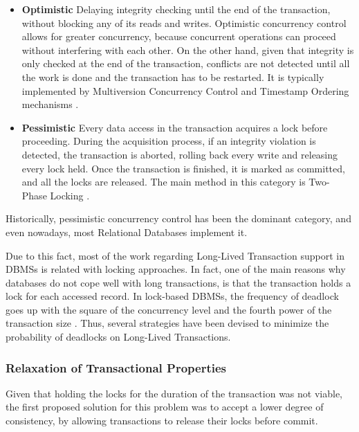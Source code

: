 \documentclass{llncs}
\begin{document}
\begin{itemize}

\item {\bf Optimistic} Delaying integrity checking until the end of
  the transaction, without blocking any of its reads and writes.
  Optimistic concurrency control allows for greater concurrency,
  because concurrent operations can proceed without interfering with
  each other. On the other hand, given that integrity is only checked
  at the end of the transaction, conflicts are not detected until all
  the work is done and the transaction has to be restarted. It is
  typically implemented by Multiversion Concurrency Control and
  Timestamp Ordering mechanisms \cite{Bernstein1981}.

\item {\bf Pessimistic} Every data access in the transaction acquires
  a lock before proceeding. During the acquisition process, if an
  integrity violation is detected, the transaction is aborted, rolling
  back every write and releasing every lock held. Once the transaction
  is finished, it is marked as committed, and all the locks are
  released. The main method in this category is Two-Phase Locking
  \cite{Bernstein1981}.

\end{itemize}

Historically, pessimistic concurrency control has been the dominant
category, and even nowadays, most Relational Databases implement it.

Due to this fact, most of the work regarding Long-Lived Transaction
support in DBMSs is related with locking approaches. In fact, one of
the main reasons why databases do not cope well with long
transactions, is that the transaction holds a lock for each accessed
record. In lock-based DBMSs, the frequency of deadlock goes up with
the square of the concurrency level and the fourth power of the
transaction size \cite{gray1981transaction}. Thus, several strategies
have been devised to minimize the probability of deadlocks on
Long-Lived Transactions.

\subsubsection{Relaxation of Transactional Properties}

Given that holding the locks for the duration of the transaction was
not viable, the first proposed solution for this problem was to accept
a lower degree of consistency, by allowing transactions to release
their locks before commit.
\end{document}
